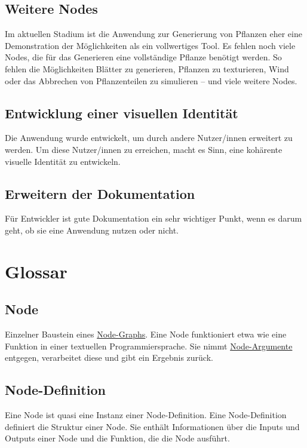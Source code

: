 \documentclass[ngerman]{article}
\begin{document}
\subsection*{Weitere Nodes}
Im aktuellen Stadium ist die Anwendung zur Generierung von Pflanzen eher eine Demonstration der Möglichkeiten als ein vollwertiges Tool. Es fehlen noch viele Nodes, die für das Generieren eine vollständige Pflanze benötigt werden. So fehlen die Möglichkeiten Blätter zu generieren, Pflanzen zu texturieren, Wind oder das Abbrechen von Pflanzenteilen zu simulieren – und viele weitere Nodes.

\subsection*{Entwicklung einer visuellen Identität}
Die Anwendung wurde entwickelt, um durch andere Nutzer/innen erweitert zu werden. 
Um diese Nutzer/innen zu erreichen, macht es Sinn, eine kohärente visuelle Identität zu entwickeln.

\subsection*{Erweitern der Dokumentation}
Für Entwickler ist gute Dokumentation ein sehr wichtiger Punkt, wenn es darum geht, ob sie eine Anwendung nutzen oder nicht. 

\pagebreak
\section{Glossar}

\subsection{Node}
\label{sec:node}
Einzelner Baustein eines \hyperref[sec:node_graph]{Node-Graphs}. Eine Node funktioniert etwa wie eine Funktion in einer textuellen Programmiersprache. Sie nimmt \hyperref[sec:node_argumente]{Node-Argumente} entgegen, verarbeitet diese und gibt ein Ergebnis zurück. 


\subsection{Node-Definition}
\label{sec:node_definition}
Eine Node ist quasi eine Instanz einer Node-Definition. Eine Node-Definition definiert die Struktur einer Node. Sie enthält Informationen über die Inputs und Outputs einer Node und die Funktion, die die Node ausführt.
\end{document}
